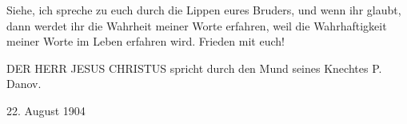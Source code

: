 Siehe, ich spreche zu euch durch die Lippen eures Bruders, und wenn ihr glaubt, dann werdet ihr die Wahrheit meiner Worte erfahren, weil die Wahrhaftigkeit meiner Worte im Leben erfahren wird. Frieden mit euch!

DER HERR JESUS CHRISTUS spricht durch den Mund seines Knechtes P. Danov.

22. August 1904




